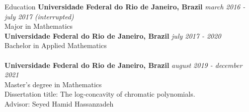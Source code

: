 \documentclass{resume} %
\begin{document}

\begin{rSection}{Education}
{\bf Universidade Federal do Rio de Janeiro, Brazil} \hfill {\em march 2016 - july 2017 (interrupted)} 
\\ Major in Mathematics\\
{\bf Universidade Federal do Rio de Janeiro, Brazil} \hfill {\em july 2017 - 2020} 
\\ Bachelor in Applied Mathematics
\\
\\{\bf Universidade Federal do Rio de Janeiro, Brazil} \hfill {\em august 2019 - december 2021} 
\\ Master's degree in Mathematics
\\ Dissertation title: The log-concavity of chromatic polynomials.
\\ Advisor: Seyed Hamid Hassanzadeh

\end{rSection}

\end{document}
